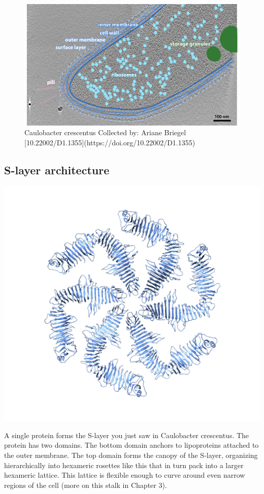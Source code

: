 \documentclass[]{tufte-book}
\begin{document}
\begin{figure}
\includegraphics{img/2_6_Ccrescentus} \caption[Caulobacter crescentus Collected by]{Caulobacter crescentus Collected by: Ariane Briegel [10.22002/D1.1355](https://doi.org/10.22002/D1.1355)}\label{fig:unnamed-chunk-17}
\end{figure}

\hypertarget{S-layer_architecture}{\subsection{S-layer
architecture}\label{S-layer_architecture}}

\includegraphics{img/02_schematic/2_6_1_SLayerTop}

A single protein forms the S-layer you just saw in Caulobacter
crescentus. The protein has two domains. The bottom domain anchors to
lipoproteins attached to the outer membrane. The top domain forms the
canopy of the S-layer, organizing hierarchically into hexameric rosettes
like this that in turn pack into a larger hexameric lattice. This
lattice is flexible enough to curve around even narrow regions of the
cell (more on this stalk in Chapter 3).
\end{document}
